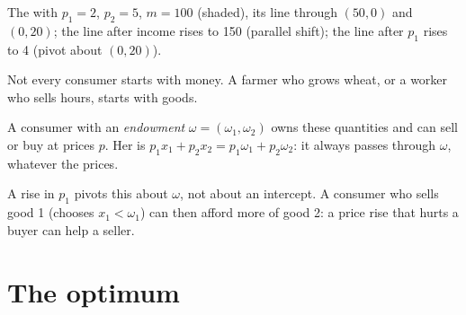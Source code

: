 \begin{omfigure}

{\small The  with $p_1 = 2$, $p_2 = 5$, $m = 100$ (shaded), its
line through $(50, 0)$ and $(0, 20)$; the line after income rises to 150
(parallel shift); the line after $p_1$ rises to 4 (pivot about $(0, 20)$).}
\end{omfigure}

Not every consumer starts with money. A farmer who grows wheat, or a
worker who sells hours, starts with goods.

\begin{definition}[Endowment]\label{def:b1:consumer-choice:endowment}
A consumer with an \emph{endowment} $\omega = (\omega_1, \omega_2)$ owns these
quantities and can sell or buy at prices $p$. Her  is
$p_1x_1 + p_2x_2 = p_1\omega_1 + p_2\omega_2$: it always passes through $\omega$,
whatever the prices.
\end{definition}

A rise in $p_1$ pivots this  about $\omega$, not about an
intercept. A consumer who sells good 1 (chooses $x_1 < \omega_1$) can then
afford more of good 2: a price rise that hurts a buyer can help a seller.

\section{The optimum}\label{sec:b1:consumer-choice:optimum}

